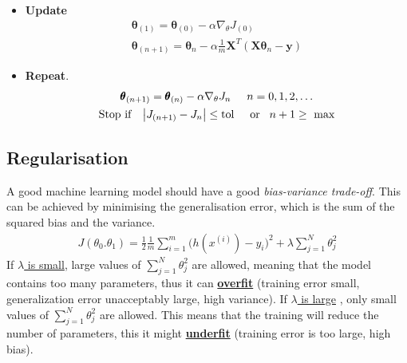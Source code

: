 \documentclass[a4paper,10pt]{article}
\begin{document}
\begin{itemize}
        \vspace*{-0.4cm}
    \item \textbf{Update}
        \begin{gather*}
            \pmb{\theta}_{(1)} = \pmb{\theta}_{(0)} - \alpha\nabla_\theta J_{(0)}\\
            \pmb{\theta}_{(n+1)} = \pmb{\theta}_n - \alpha\frac{1}{m}\mathbf{X}^T(\mathbf{X}\pmb{\theta}_n-\pmb{y})
        \end{gather*}
    \item \textbf{Repeat}.
        \begin{gather*}
            \pmb{\theta}_{(n+1)} = \pmb{\theta}_{(n)} - \alpha\nabla_\theta J_{n}\hspace*{0.5cm}n = 0,1,2,\dots\\
            \text{Stop if}\hspace*{0.3cm}\left| J_{(n+1)}-J_n \right|\leq\text{tol}\hspace*{0.5cm}\text{or}\hspace*{0.3cm}n+1\geq\text{ max}
        \end{gather*}
\end{itemize}

\subsection{Regularisation}
A good machine learning model should have a good \textit{bias-variance trade-off}. This can be achieved by minimising the generalisation error, which is the sum of the squared bias and the variance. 
\begin{gather*}
    J(\theta_0. \theta_1) = \frac{1}{2}\frac{1}{m}\sum_{i=1}^{m}\Big(h(x^{(i)})-y_i\Big)^2 + \lambda\sum_{j=1}^{N}\theta_j^2
\end{gather*}
If \underline{$\lambda$ is small}, large values of $\sum_{j=1}^{N}\theta_j^2$ are allowed, meaning that the model contains too many parameters, thus it can \underline{\textbf{overfit}} (training error small, generalization error unacceptably large, high variance). If \underline{$\lambda$ is large}  , only small values of $\sum_{j=1}^{N}\theta_j^2$ are allowed. This means that the training will reduce the number of parameters, this it might \underline{\textbf{underfit}} (training error is too large, high bias). 
\end{document}
